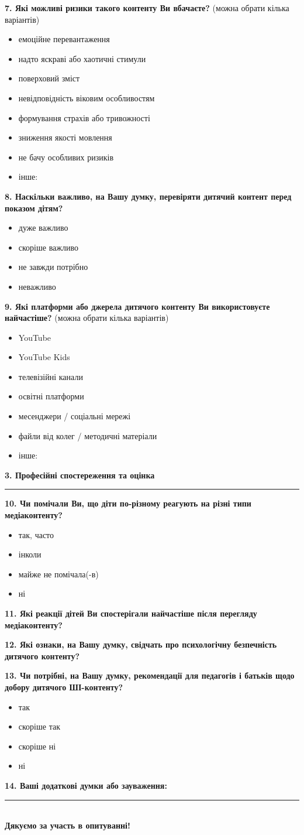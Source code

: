 \documentclass[12pt,a4paper]{article}
\newcommand{\midruleline}{%
    {\color{linegray}\rule{\linewidth}{0.6pt}}
}
\newcommand{\formsection}[1]{%
    \vspace{0.8em}
    {\large\bfseries\color{main} #1}\par
    \vspace{0.35em}
    \midruleline
    \vspace{0.45em}
}
\newcommand{\checkboxitem}[1]{\item[□] #1}
\newcommand{\answerline}{%
    \vspace{0.9em}
    \hrulefill
    \vspace{0.9em}
}
\newcommand{\twolines}{%
    \answerline
    \answerline
}
\begin{document}
\textbf{7. Які можливі ризики такого контенту Ви вбачаєте?}
{\small\color{textgray}(можна обрати кілька варіантів)}
\begin{itemize}[leftmargin=1.5cm, itemsep=2pt, topsep=4pt]
    \checkboxitem{емоційне перевантаження}
    \checkboxitem{надто яскраві або хаотичні стимули}
    \checkboxitem{поверховий зміст}
    \checkboxitem{невідповідність віковим особливостям}
    \checkboxitem{формування страхів або тривожності}
    \checkboxitem{зниження якості мовлення}
    \checkboxitem{не бачу особливих ризиків}
    \checkboxitem{інше: \hrulefill}
\end{itemize}

\textbf{8. Наскільки важливо, на Вашу думку, перевіряти дитячий контент перед показом дітям?}
\begin{itemize}[leftmargin=1.5cm, itemsep=2pt, topsep=4pt]
    \checkboxitem{дуже важливо}
    \checkboxitem{скоріше важливо}
    \checkboxitem{не завжди потрібно}
    \checkboxitem{неважливо}
\end{itemize}

\textbf{9. Які платформи або джерела дитячого контенту Ви використовуєте найчастіше?}
{\small\color{textgray}(можна обрати кілька варіантів)}
\begin{itemize}[leftmargin=1.5cm, itemsep=2pt, topsep=4pt]
    \checkboxitem{YouTube}
    \checkboxitem{YouTube Kids}
    \checkboxitem{телевізійні канали}
    \checkboxitem{освітні платформи}
    \checkboxitem{месенджери / соціальні мережі}
    \checkboxitem{файли від колег / методичні матеріали}
    \checkboxitem{інше: \hrulefill}
\end{itemize}

\formsection{3. Професійні спостереження та оцінка}

\textbf{10. Чи помічали Ви, що діти по-різному реагують на різні типи медіаконтенту?}
\begin{itemize}[leftmargin=1.5cm, itemsep=2pt, topsep=4pt]
    \checkboxitem{так, часто}
    \checkboxitem{інколи}
    \checkboxitem{майже не помічала(-в)}
    \checkboxitem{ні}
\end{itemize}

\textbf{11. Які реакції дітей Ви спостерігали найчастіше після перегляду медіаконтенту?}
\twolines

\textbf{12. Які ознаки, на Вашу думку, свідчать про психологічну безпечність дитячого контенту?}
\twolines

\textbf{13. Чи потрібні, на Вашу думку, рекомендації для педагогів і батьків щодо добору дитячого ШІ-контенту?}
\begin{itemize}[leftmargin=1.5cm, itemsep=2pt, topsep=4pt]
    \checkboxitem{так}
    \checkboxitem{скоріше так}
    \checkboxitem{скоріше ні}
    \checkboxitem{ні}
\end{itemize}

\textbf{14. Ваші додаткові думки або зауваження:}
\twolines

\vfill

\begin{center}
    {\color{linegray}\rule{0.36\linewidth}{0.8pt}}\\[0.45em]
    \textbf{\color{main}Дякуємо за участь в опитуванні!}
\end{center}
\end{document}
